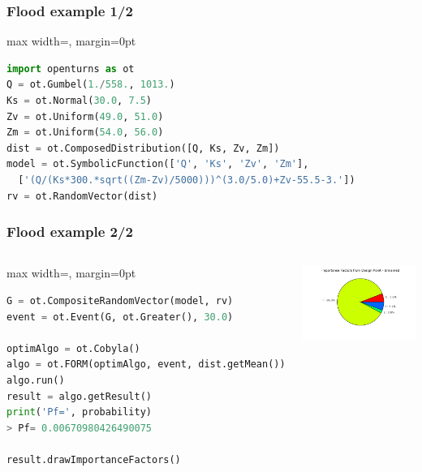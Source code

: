 \documentclass{beamer}
\begin{document}
\begin{frame}[containsverbatim]
\frametitle{Flood example 1/2}
\begin{adjustbox}{max width=\linewidth, margin=0pt}
\begin{lstlisting}[language=Python,basicstyle=\ttfamily,keywordstyle=\color{red}]
import openturns as ot
Q = ot.Gumbel(1./558., 1013.)
Ks = ot.Normal(30.0, 7.5)
Zv = ot.Uniform(49.0, 51.0)
Zm = ot.Uniform(54.0, 56.0)
dist = ot.ComposedDistribution([Q, Ks, Zv, Zm])
model = ot.SymbolicFunction(['Q', 'Ks', 'Zv', 'Zm'],
  ['(Q/(Ks*300.*sqrt((Zm-Zv)/5000)))^(3.0/5.0)+Zv-55.5-3.'])
rv = ot.RandomVector(dist)
\end{lstlisting}
\end{adjustbox}
\end{frame}

\begin{frame}[containsverbatim]
\frametitle{Flood example 2/2}

  \begin{columns}

\begin{adjustbox}{max width=\linewidth, margin=0pt}
\begin{lstlisting}[language=Python,basicstyle=\ttfamily,keywordstyle=\color{red}]
G = ot.CompositeRandomVector(model, rv)
event = ot.Event(G, ot.Greater(), 30.0)

optimAlgo = ot.Cobyla()
algo = ot.FORM(optimAlgo, event, dist.getMean())
algo.run()
result = algo.getResult()
print('Pf=', probability)
> Pf= 0.00670980426490075

result.drawImportanceFactors()
\end{lstlisting}
\end{adjustbox}


\includegraphics[width=1.2\textwidth]{figures/imp_fact}

\end{columns}

\end{frame}
\end{document}
